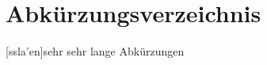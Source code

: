 \chapter{Abkürzungsverzeichnis}
\begin{acronym}
	[ssla'en]{sehr sehr lange Abkürzungen}
\end{acronym}